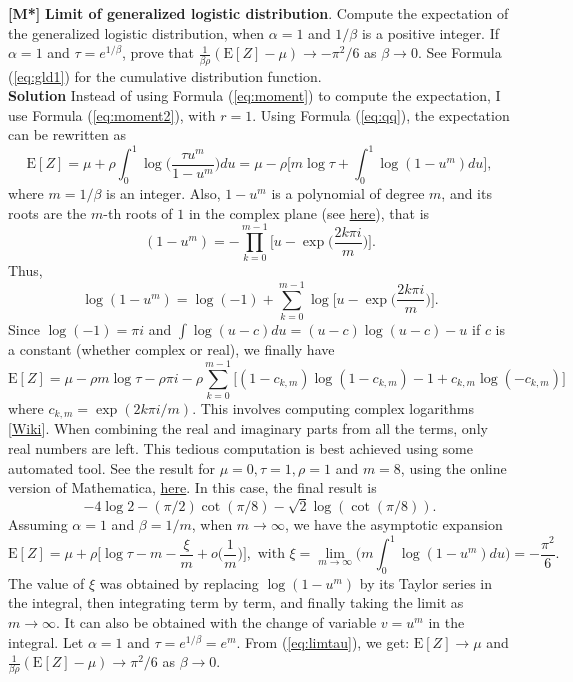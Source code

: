 \documentclass[10pt]{article}
\begin{document}
\begin{Exercise} \label{exercise6} {\bf [M*]}
{\bf Limit of generalized logistic distribution}. Compute the expectation of the \textcolor{index}{generalized logistic distribution}, when $\alpha=1$ and $1/\beta$ is a positive integer. If $\alpha=1$ and $\tau=e^{1/\beta}$, prove that $\frac{1}{\beta\rho}(\mbox{E}[Z]-\mu)\rightarrow-\pi^2/6$ as  $\beta\rightarrow 0$. See Formula (\ref{eq:gld1}) for the cumulative distribution function. \vspace{1ex} \\
{\bf Solution} Instead of using Formula (\ref{eq:moment}) to compute the expectation, I use Formula (\ref{eq:moment2}), with $r=1$. Using Formula (\ref{eq:qq}), the expectation can be rewritten as
$$\mbox{E}[Z]=\mu+\rho\int_{0}^1 \log \Big(\frac{\tau u^{m}}{1-u^{m}}\Big)du = \mu - \rho\Big[m\log \tau + \int_0^1 \log(1-u^m)du\Big],$$
where $m=1/\beta$ is an integer. Also, $1-u^m$ is a polynomial of degree $m$, and its roots are the $m$-th roots of $1$ in the complex plane (see \href{https://en.wikipedia.org/wiki/Root_of_unity}{here}), that is
$$(1-u^m)=-\prod_{k=0}^{m-1}\Big[u-\exp\Big(\frac{2 k\pi i}{m}\Big)\Big].$$
Thus,
$$\log(1-u^m)=\log(-1)+\sum_{k=0}^{m-1}\log \Big[u-\exp\Big(\frac{2 k\pi i}{m}\Big)\Big].$$
Since $\log(-1)=\pi i$ and $\int \log (u - c) du = (u - c)\log(u - c) - u$ if $c$ is a constant (whether complex or real), we finally have
$$\mbox{E}[Z]= \mu - \rho m\log \tau -\rho\pi i - \rho\sum_{k=0}^{m-1} \Big[(1-c_{k,m})\log(1-c_{k,m})-1+c_{k,m}\log(-c_{k,m})\Big] $$
where $c_{k,m} =\exp(2 k\pi i/m)$. This involves computing complex logarithms  [\href{https://en.wikipedia.org/wiki/Complex_logarithm}{Wiki}]. When combining the real and imaginary parts from all the terms, only real numbers are left. This tedious computation is best achieved using some automated tool. See the result for $\mu=0,\tau=1,\rho=1$ and $m=8$,
using the online version of Mathematica, \href{https://bit.ly/3oZzA49}{here}. In this case, the final result is
$$  -4\log 2 - (\pi/2) \cot(\pi/8) - \sqrt{2} \log(\cot(\pi/8)).$$
Assuming $\alpha=1$ and $\beta=1/m$, when $m\rightarrow\infty$, we have the asymptotic expansion
\begin{equation}
\mbox{E}[Z]= \mu+\rho\Big[\log\tau -m - \frac{\xi}{m}  + o\Big(\frac{1}{m}\Big)\Big], \mbox{ with } \xi = \lim_{m\rightarrow \infty} \Big(m\int_0^1 \log(1-u^m)du\Big)=-\frac{\pi^2}{6}. \label{eq:limtau}
\end{equation}
The value of $\xi$ was obtained by replacing $\log(1-u^m)$ by its Taylor series in the integral, then integrating term by term, and finally taking the limit as $m\rightarrow \infty$. It can also be obtained with the change of variable $v=u^m$ in the integral.  Let $\alpha=1$ and $\tau=e^{1/\beta}=e^m$. From (\ref{eq:limtau}), we get: $\mbox{E}[Z]\rightarrow \mu$ and $\frac{1}{\beta\rho}(\mbox{E}[Z]-\mu)\rightarrow \pi^2/6$ as  $\beta\rightarrow 0$.
\end{Exercise}
\end{document}
